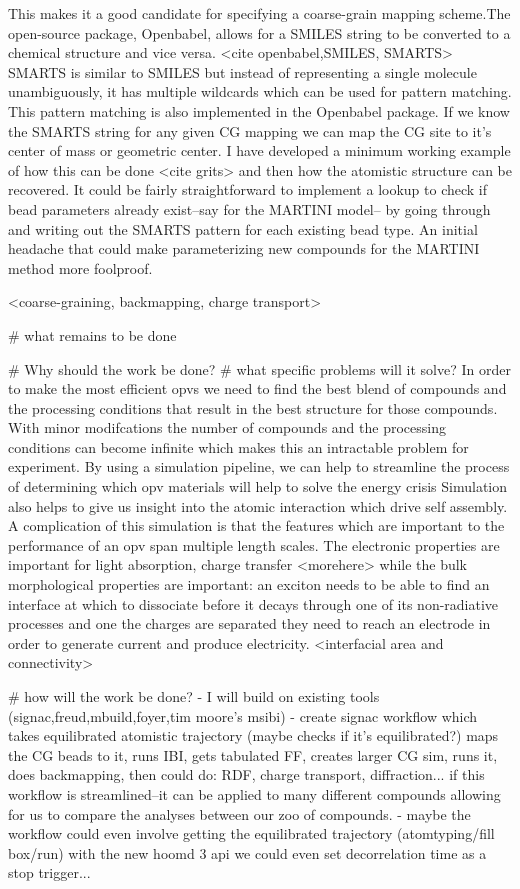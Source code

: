 This makes it a good candidate for specifying a coarse-grain mapping scheme.The open-source package, Openbabel, allows for a SMILES string to be converted to a chemical structure and vice versa. <cite openbabel,SMILES, SMARTS> SMARTS is similar to SMILES but instead of representing a single molecule unambiguously, it has multiple wildcards which can be used for pattern matching. This pattern matching is also implemented in the Openbabel package. If we know the SMARTS string for any given CG mapping we can map the CG site to it's center of mass or geometric center.
I have developed a minimum working example of how this can be done <cite grits> and then how the atomistic structure can be recovered. It could be fairly straightforward to implement a lookup to check if bead parameters already exist--say for the MARTINI model-- by going through and writing out the SMARTS pattern for each existing bead type. An initial headache that could make parameterizing new compounds for the MARTINI method more foolproof.

<coarse-graining, backmapping, charge transport>

# what remains to be done

# Why should the work be done?
# what specific problems will it solve?
In order to make the most efficient opvs we need to find the best blend of compounds and the processing conditions that result in the best structure for those compounds. With minor modifcations the number of compounds and the processing conditions can become infinite which makes this an intractable problem for experiment.
By using a simulation pipeline, we can help to streamline the process of determining which opv materials will help to solve the energy crisis
Simulation also helps to give us insight into the atomic interaction which drive self assembly.
A complication of this simulation is that the features which are important to the performance of an opv span multiple length scales. The electronic properties are important for light absorption, charge transfer <morehere>
while the bulk morphological properties are important: an exciton needs to be able to find an interface at which to dissociate before it decays through one of its non-radiative processes and one the charges are separated they need to reach an electrode in order to generate current and produce electricity. <interfacial area and connectivity>

# how will the work be done?
- I will build on existing tools (signac,freud,mbuild,foyer,tim moore's msibi)
- create signac workflow which takes equilibrated atomistic trajectory (maybe checks if it's equilibrated?) maps the CG beads to it, runs IBI, gets tabulated FF, creates larger CG sim, runs it, does backmapping, then could do: RDF, charge transport, diffraction... if this workflow is streamlined--it can be applied to many different compounds allowing for us to compare the analyses between our zoo of compounds.
- maybe the workflow could even involve getting the equilibrated trajectory (atomtyping/fill box/run) with the new hoomd 3 api we could even set decorrelation time as a stop trigger...

